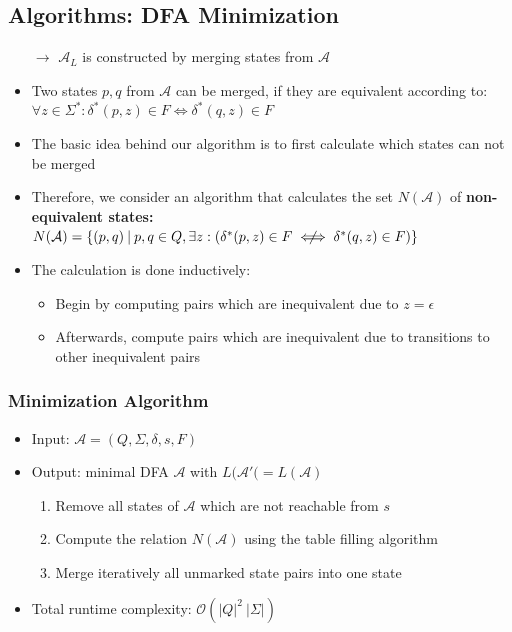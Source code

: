 \documentclass[a3paper, 8pt]{extarticle}
\newcommand{\notiff}{%
  \mathrel{{\ooalign{\hidewidth$\not\phantom{"}$\hidewidth\cr$\iff$}}}}
\begin{document}
\begin{multicols*}{6}
\subsection{Algorithms: DFA Minimization}
\begin{itemize}
    \item[$\to$] $\mathcal{A}_L$ is constructed by merging states from $\mathcal{A}$
    \item Two states $p,q$ from $\mathcal{A}$ can be merged, if they are equivalent according to: $\forall z \in \Sigma^*: \delta^*(p,z) \in F \iff \delta^*(q,z) \in F$
    \item The basic idea behind our algorithm is to first calculate which states can not be merged
    \item Therefore, we consider an algorithm that calculates the set $N(\mathcal{A})$ of \textbf{non-equivalent states:} $N(\mathcal{A})=\{(p,q)\:|\:p,q\in Q, \exists z: (\delta^*(p,z) \in F \notiff \delta^*(q,z) \in F)\}$
    \item The calculation is done inductively: \begin{itemize}
        \item Begin by computing pairs which are inequivalent due to $z=\epsilon$
        \item Afterwards, compute pairs which are inequivalent due to transitions to other inequivalent pairs
    \end{itemize}
\end{itemize}
\subsubsection{Minimization Algorithm}
\begin{itemize}
    \item Input: $\mathcal{A}=(Q,\Sigma,\delta,s,F)$
    \item Output: minimal DFA $\mathcal{A}$ with $L(\mathcal{A'}(=L(\mathcal{A})$
    \begin{enumerate}
        \item Remove all states of $\mathcal{A}$ which are not reachable from $s$
        \item Compute the relation $N(\mathcal{A})$ using the table filling algorithm
        \item Merge iteratively all unmarked state pairs into one state
    \end{enumerate}
    \item Total runtime complexity: $\mathcal{O}(|Q|^2 \: |\Sigma|)$


\end{itemize}
\end{multicols*}
\end{document}
